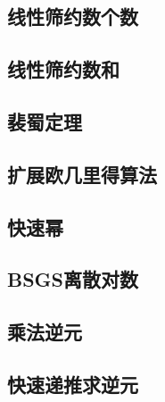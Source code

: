 \documentclass[10pt,a4paper]{article}
\begin{document}
\subsection{线性筛约数个数}
\begin{spacing}{1.5}

\end{spacing}

\subsection{线性筛约数和}
\begin{spacing}{1.5}

\end{spacing}

\subsection{裴蜀定理}
\begin{spacing}{1.5}

\end{spacing}
\subsection{扩展欧几里得算法}
\begin{spacing}{1.5}

\end{spacing}

\subsection{快速幂}

\subsection{BSGS离散对数}

\subsection{乘法逆元}
\begin{spacing}{1.5}

\end{spacing}

\subsection{快速递推求逆元}
\begin{spacing}{1.5}

\end{spacing}

\end{document}
